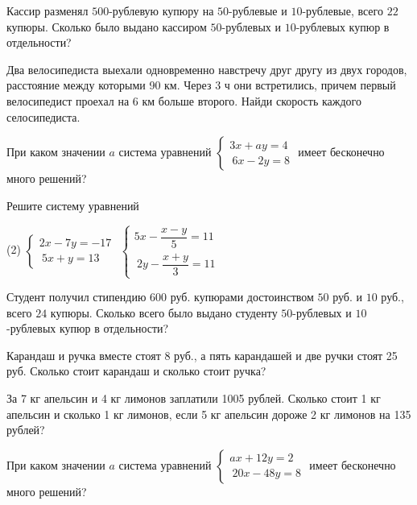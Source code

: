 \begin{class}[number=1]
\begin{listofex}
		\item Кассир разменял \( 500 \)-рублевую купюру на \( 50 \)-рублевые и \( 10 \)-рублевые, всего \( 22 \) купюры. Сколько было выдано кассиром \( 50 \)-рублевых и \( 10 \)-рублевых купюр в отдельности?
		 \item  Два велосипедиста выехали одновременно навстречу друг другу из двух городов, расстояние между которыми 90 км. Через 3 ч они встретились, причем первый велосипедист проехал на 6 км больше второго. Найди скорость каждого селосипедиста.
		 \item  При каком значении \( a \) система уравнений \( \begin{cases}
		 	3x+ay=4 \\\
		 	6x-2y=8
		 \end{cases} \) имеет бесконечно много решений?
	\end{listofex}
\end{class}

\begin{homework}[number=1]
	\begin{listofex}
		\item Решите систему уравнений \begin{tasks}(2)
			\task \( \begin{cases}
				2x-7y=-17 \\\
				5x+y=13
			\end{cases} \)
			\task \( \begin{cases}
				5x-\dfrac{x-y}{5}=11 \\\
				2y-\dfrac{x+y}{3}=11
			\end{cases} \)
		\end{tasks}
		\item  Студент получил стипендию \( 600 \) руб. купюрами достоинством \( 50 \) руб. и \( 10 \) руб., всего \( 24 \) купюры. Сколько всего было выдано студенту \( 50 \)-рублевых и \( 10 \)-рублевых купюр в отдельности? 
		\item Карандаш и ручка вместе стоят 8 руб., а пять карандашей и две ручки
		стоят 25 руб. Сколько стоит карандаш и сколько стоит ручка?
		\item За 7 кг апельсин и 4 кг лимонов заплатили 1005 рублей. Сколько стоит 1 кг апельсин и сколько 1 кг лимонов, если 5 кг апельсин дороже 2 кг лимонов на 135 рублей?
		\item  При каком значении \( a \) система уравнений \( \begin{cases}
			ax+12y=2 \\\
			20x-48y=8
		\end{cases} \) имеет бесконечно много решений?
	\end{listofex}
\end{homework}

